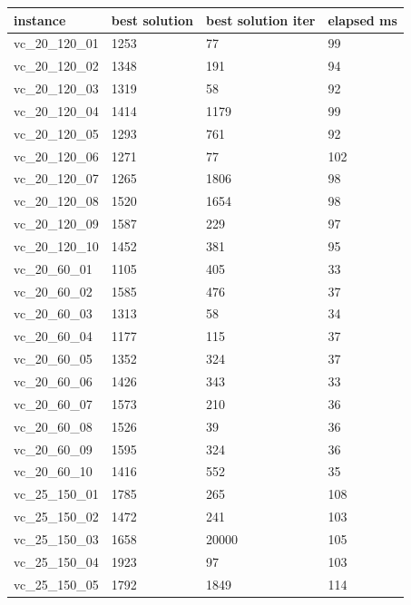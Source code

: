 \documentclass[11pt]{article}
\begin{document}
\begin{table}[!ht]
    \centering
    \begin{tabular}{|l|l|l|l|}
    \hline
        instance & best solution & best solution iter & elapsed ms \\ \hline

        vc\_20\_120\_01 & 1253 & 77 & 99 \\ \hline
        vc\_20\_120\_02 & 1348 & 191 & 94 \\ \hline
        vc\_20\_120\_03 & 1319 & 58 & 92 \\ \hline
        vc\_20\_120\_04 & 1414 & 1179 & 99 \\ \hline
        vc\_20\_120\_05 & 1293 & 761 & 92 \\ \hline
        vc\_20\_120\_06 & 1271 & 77 & 102 \\ \hline
        vc\_20\_120\_07 & 1265 & 1806 & 98 \\ \hline
        vc\_20\_120\_08 & 1520 & 1654 & 98 \\ \hline
        vc\_20\_120\_09 & 1587 & 229 & 97 \\ \hline
        vc\_20\_120\_10 & 1452 & 381 & 95 \\ \hline
        vc\_20\_60\_01 & 1105 & 405 & 33 \\ \hline
        vc\_20\_60\_02 & 1585 & 476 & 37 \\ \hline
        vc\_20\_60\_03 & 1313 & 58 & 34 \\ \hline
        vc\_20\_60\_04 & 1177 & 115 & 37 \\ \hline
        vc\_20\_60\_05 & 1352 & 324 & 37 \\ \hline
        vc\_20\_60\_06 & 1426 & 343 & 33 \\ \hline
        vc\_20\_60\_07 & 1573 & 210 & 36 \\ \hline
        vc\_20\_60\_08 & 1526 & 39 & 36 \\ \hline
        vc\_20\_60\_09 & 1595 & 324 & 36 \\ \hline
        vc\_20\_60\_10 & 1416 & 552 & 35 \\ \hline
        vc\_25\_150\_01 & 1785 & 265 & 108 \\ \hline
        vc\_25\_150\_02 & 1472 & 241 & 103 \\ \hline
        vc\_25\_150\_03 & 1658 & 20000 & 105 \\ \hline
        vc\_25\_150\_04 & 1923 & 97 & 103 \\ \hline
        vc\_25\_150\_05 & 1792 & 1849 & 114 \\ \hline

\end{tabular}
\end{table}
\end{document}

